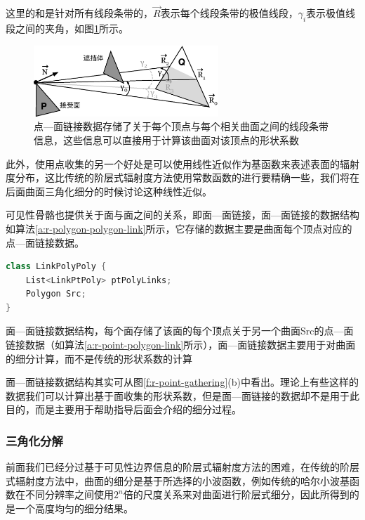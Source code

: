\noindent 这里的和是针对所有线段条带的，$\vec{R}$表示每个线段条带的极值线段，$\gamma_i$表示极值线段之间的夹角，如图\ref{f:r-point-polygon-link}所示。

\begin{figure}
	\sidecaption
	\includegraphics[width=0.62\textwidth]{figures/r/point-polygon-link}
	\caption{点—面链接数据存储了关于每个顶点与每个相关曲面之间的线段条带信息，这些信息可以直接用于计算该曲面对该顶点的形状系数}
	\label{f:r-point-polygon-link}
\end{figure}

此外，使用点收集的另一个好处是可以使用线性近似作为基函数来表述表面的辐射度分布，这比传统的阶层式辐射度方法使用常数函数的进行要精确一些，我们将在后面曲面三角化细分的时候讨论这种线性近似。

可见性骨骼也提供关于面与面之间的关系，即面—面链接，面—面链接的数据结构如算法\ref{a:r-polygon-polygon-link}所示，它存储的数据主要是曲面每个顶点对应的点—面链接数据。

\begin{algorithm}
\begin{lstlisting}[language=C++, mathescape]
class LinkPolyPoly {
	List<LinkPtPoly> ptPolyLinks;
	Polygon Src;
}
\end{lstlisting}
\caption{面—面链接数据结构，每个面存储了该面的每个顶点关于另一个曲面Src的点—面链接数据（如算法\ref{a:r-point-polygon-link}所示），面—面链接数据主要用于对曲面的细分计算，而不是传统的形状系数的计算}
\label{a:r-polygon-polygon-link}
\end{algorithm}

面—面链接数据结构其实可从图\ref{f:r-point-gathering}(b)中看出。理论上有些这样的数据我们可以计算出基于面收集的形状系数，但是面—面链接的数据却不是用于此目的，而是主要用于帮助指导后面会介绍的细分过程。




\subsubsection{三角化分解}
前面我们已经分过基于可见性边界信息的阶层式辐射度方法的困难，在传统的阶层式辐射度方法中，曲面的细分是基于所选择的小波函数，例如传统的哈尔小波基函数在不同分辨率之间使用$2^{n}$倍的尺度关系来对曲面进行阶层式细分，因此所得到的是一个高度均匀的细分结果。

